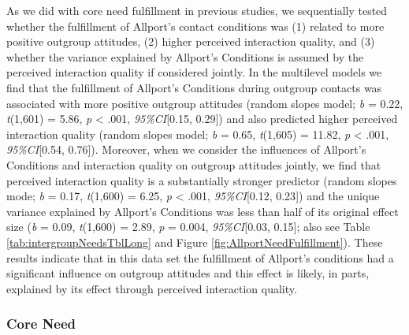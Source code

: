 As we did with core need fulfillment in previous studies, we
sequentially tested whether the fulfillment of Allport's contact
conditions was (1) related to more positive outgroup attitudes, (2)
higher perceived interaction quality, and (3) whether the variance
explained by Allport's Conditions is assumed by the perceived
interaction quality if considered jointly. In the multilevel models we
find that the fulfillment of Allport's Conditions during outgroup
contacts was associated with more positive outgroup attitudes (random
slopes model; \textit{b} = 0.22, \textit{t}(1,601) = 5.86, \textit{p}
\textless{} .001, \textit{95\%CI}{[}0.15, 0.29{]}) and also predicted
higher perceived interaction quality (random slopes model; \textit{b} =
0.65, \textit{t}(1,605) = 11.82, \textit{p} \textless{} .001,
\textit{95\%CI}{[}0.54, 0.76{]}). Moreover, when we consider the
influences of Allport's Conditions and interaction quality on outgroup
attitudes jointly, we find that perceived interaction quality is a
substantially stronger predictor (random slopes mode; \textit{b} = 0.17,
\textit{t}(1,600) = 6.25, \textit{p} \textless{} .001,
\textit{95\%CI}{[}0.12, 0.23{]}) and the unique variance explained by
Allport's Conditions was less than half of its original effect size
(\textit{b} = 0.09, \textit{t}(1,600) = 2.89, \textit{p} = 0.004,
\textit{95\%CI}{[}0.03, 0.15{]}; also see Table
\ref{tab:intergroupNeedsTblLong} and Figure
\ref{fig:AllportNeedFulfillment}). These results indicate that in this
data set the fulfillment of Allport's conditions had a significant
influence on outgroup attitudes and this effect is likely, in parts,
explained by its effect through perceived interaction quality.

\subsubsection{Core Need}

